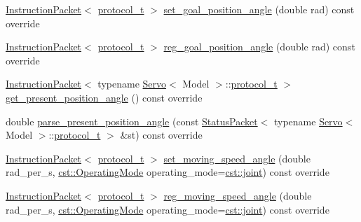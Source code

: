 \begin{DoxyCompactItemize}
\hyperlink{classdynamixel_1_1_instruction_packet}{Instruction\+Packet}$<$ \hyperlink{classdynamixel_1_1servos_1_1_servo_a7718c41cee1187b992836f4b6bad8a38}{protocol\+\_\+t} $>$ \hyperlink{classdynamixel_1_1servos_1_1_servo_a02827789424669a3e34d5e87b7446bdd}{set\+\_\+goal\+\_\+position\+\_\+angle} (double rad) const override
\item 
\hyperlink{classdynamixel_1_1_instruction_packet}{Instruction\+Packet}$<$ \hyperlink{classdynamixel_1_1servos_1_1_servo_a7718c41cee1187b992836f4b6bad8a38}{protocol\+\_\+t} $>$ \hyperlink{classdynamixel_1_1servos_1_1_servo_ac435a6f8e971bd1db3d7456edb97cf03}{reg\+\_\+goal\+\_\+position\+\_\+angle} (double rad) const override
\item 
\hyperlink{classdynamixel_1_1_instruction_packet}{Instruction\+Packet}$<$ typename \hyperlink{classdynamixel_1_1servos_1_1_servo}{Servo}$<$ Model $>$\+::\hyperlink{classdynamixel_1_1servos_1_1_servo_a7718c41cee1187b992836f4b6bad8a38}{protocol\+\_\+t} $>$ \hyperlink{classdynamixel_1_1servos_1_1_servo_a28c5330eed1d17ae41b0bbf5268d09e6}{get\+\_\+present\+\_\+position\+\_\+angle} () const override
\item 
double \hyperlink{classdynamixel_1_1servos_1_1_servo_a949e38cec51952288fb86b56c7a0748f}{parse\+\_\+present\+\_\+position\+\_\+angle} (const \hyperlink{classdynamixel_1_1_status_packet}{Status\+Packet}$<$ typename \hyperlink{classdynamixel_1_1servos_1_1_servo}{Servo}$<$ Model $>$\+::\hyperlink{classdynamixel_1_1servos_1_1_servo_a7718c41cee1187b992836f4b6bad8a38}{protocol\+\_\+t} $>$ \&st) const override
\item 
\hyperlink{classdynamixel_1_1_instruction_packet}{Instruction\+Packet}$<$ \hyperlink{classdynamixel_1_1servos_1_1_servo_a7718c41cee1187b992836f4b6bad8a38}{protocol\+\_\+t} $>$ \hyperlink{classdynamixel_1_1servos_1_1_servo_a35e4d514a5a87ae20c80e36b95a7a894}{set\+\_\+moving\+\_\+speed\+\_\+angle} (double rad\+\_\+per\+\_\+s, \hyperlink{namespacedynamixel_1_1servos_1_1cst_ac17b5608f65c6495114d34f8efc4d809}{cst\+::\+Operating\+Mode} operating\+\_\+mode=\hyperlink{namespacedynamixel_1_1servos_1_1cst_ac17b5608f65c6495114d34f8efc4d809a1fdfcfad31f04d24b25c0842e9d99c48}{cst\+::joint}) const override
\item 
\hyperlink{classdynamixel_1_1_instruction_packet}{Instruction\+Packet}$<$ \hyperlink{classdynamixel_1_1servos_1_1_servo_a7718c41cee1187b992836f4b6bad8a38}{protocol\+\_\+t} $>$ \hyperlink{classdynamixel_1_1servos_1_1_servo_a31c0e19f19709071556585881b36e2a6}{reg\+\_\+moving\+\_\+speed\+\_\+angle} (double rad\+\_\+per\+\_\+s, \hyperlink{namespacedynamixel_1_1servos_1_1cst_ac17b5608f65c6495114d34f8efc4d809}{cst\+::\+Operating\+Mode} operating\+\_\+mode=\hyperlink{namespacedynamixel_1_1servos_1_1cst_ac17b5608f65c6495114d34f8efc4d809a1fdfcfad31f04d24b25c0842e9d99c48}{cst\+::joint}) const override

\end{DoxyCompactItemize}
